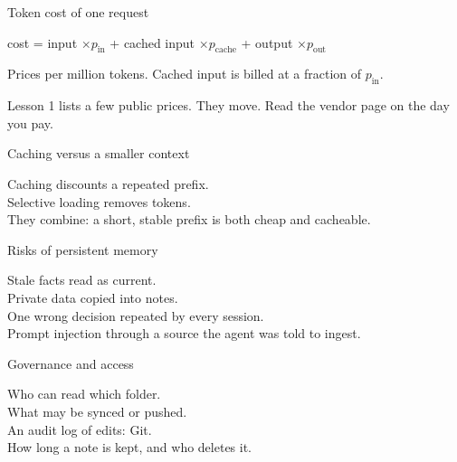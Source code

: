 
\begin{frame}{Token cost of one request}
  \vspace{0.8em}
  {\large\color{ink}
  cost = input $\times p_{\mathrm{in}}$ + cached input $\times p_{\mathrm{cache}}$ + output $\times p_{\mathrm{out}}$\par}
  \vspace{0.6em}
  {\small Prices per million tokens. Cached input is billed at a fraction of $p_{\mathrm{in}}$.\par}
  \vspace{0.4em}
  {\small Lesson 1 lists a few public prices. They move. Read the vendor page on the day you pay.\par}
\end{frame}

\begin{frame}{Caching versus a smaller context}
  {\small
  Caching discounts a repeated prefix.\\[0.6em]
  Selective loading removes tokens.\\[0.6em]
  They combine: a short, stable prefix is both cheap and cacheable.\par}
\end{frame}

\begin{frame}{Risks of persistent memory}
  {\small
  Stale facts read as current.\\[0.45em]
  Private data copied into notes.\\[0.45em]
  One wrong decision repeated by every session.\\[0.45em]
  Prompt injection through a source the agent was told to ingest.\par}
\end{frame}

\begin{frame}{Governance and access}
  {\small
  Who can read which folder.\\[0.45em]
  What may be synced or pushed.\\[0.45em]
  An audit log of edits: Git.\\[0.45em]
  How long a note is kept, and who deletes it.\par}
\end{frame}

